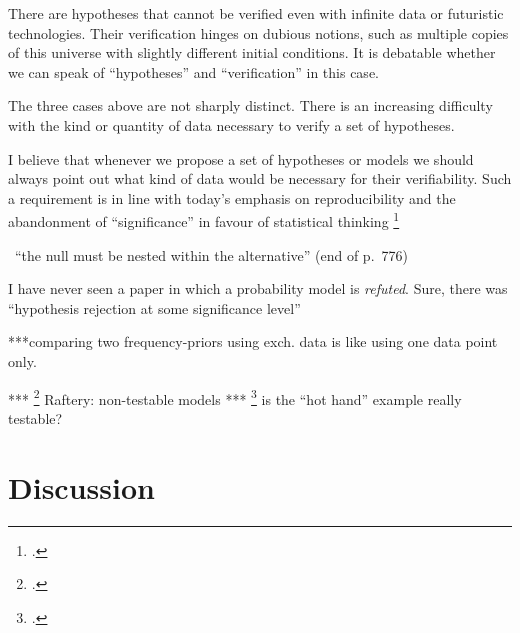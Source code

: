 \documentclass[\ifafour a4paper,12pt,\else a5paper,10pt,\fi%
onecolumn,oneside,article,%
british%
]{memoir}
\theoremstyle{remark}
\theoremstyle{innote}
\newcommand*{\citep}{\footcites}
\renewcommand*{\|}[1][]{\nonscript\:#1\vert\nonscript\:\mathopen{}}
\renewcommand*{\=}{\TextOrMath\texteq\eq}
\newcommand*{\sect}{\S}%
\newcommand*{\puzzle}{{\fontencoding{U}\fontfamily{fontawesometwo}\selectfont\symbol{225}}}
\newcommand{\mynote}[1]{ {\color{notecolour}\puzzle\ #1}}
\begin{document}
There are hypotheses that cannot be verified even with infinite data or
futuristic technologies. Their verification hinges on dubious notions, such
as multiple copies of this universe with slightly different initial
conditions. It is debatable whether we can speak of \enquote{hypotheses}
and \enquote{verification} in this case.

The three cases above are not sharply distinct. There is an increasing
difficulty with the kind or quantity of data necessary to verify a set of
hypotheses.

I believe that whenever we propose a set of hypotheses or models we should
always point out what kind of data would be necessary for their
verifiability. Such a requirement is in line with today's emphasis on
reproducibility and the abandonment of \enquote{significance} in favour of
statistical thinking \citep[\sect~1]{asa2019}


\mynote{\enquote{the null must be nested within the alternative} (end of p.~776)}






I have never seen a paper in which a probability model is \emph{refuted}.
Sure, there was \enquote{hypothesis rejection at some significance level}



***comparing two frequency-priors using exch. data is like using one data
point only.


*** \citep{rafteryetal1989} Raftery: non-testable models
*** \citep{kassetal1995} is the \enquote{hot hand} example really testable?

\section{Discussion}
\label{sec:discussion}
\end{document}
